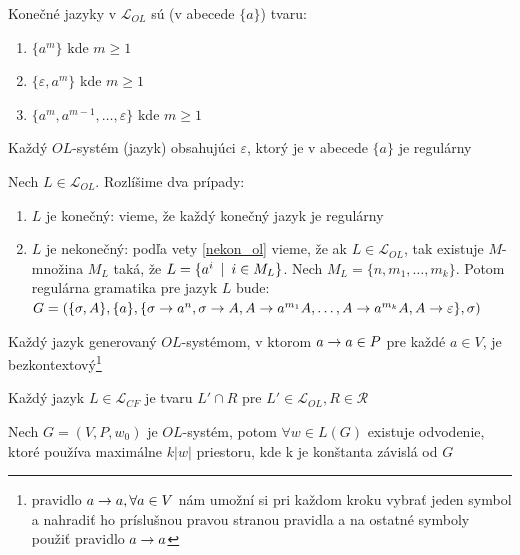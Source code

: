 \begin{poznamka}
    Konečné jazyky v $\mathcal{L}_{OL}$ sú (v abecede $\{a\}$) tvaru:
    \begin{enumerate}
    \item $\{a^{m}\}$ kde $m\geq1$
    \item $\{\varepsilon,a^{m}\}$ kde $m\geq1$
    \item $\{a^{m},a^{m-1},\dots,\varepsilon\}$ kde $m\geq1$
    \end{enumerate}
\end{poznamka}

\begin{veta}
    Každý $OL$-systém (jazyk) obsahujúci $\varepsilon$, ktorý je v
    abecede $\{a\}$ je regulárny
\end{veta}

\begin{dokaz}
    Nech $L\in\mathcal{L}_{OL}$. Rozlíšime dva prípady:
    \begin{enumerate}
    \item $L$ je konečný: vieme, že každý konečný jazyk je regulárny
    \item $L$ je nekonečný: podľa vety \ref{nekon_ol} vieme, že ak
        $L\in\mathcal{L}_{OL}$, tak existuje $M$-množina $M_L$ taká, že
        $L=\{a^i\enspace |\enspace i\in M_L\}$. Nech $M_L=\{n,m_1,\dots,m_k\}$. Potom
        regulárna gramatika pre jazyk $L$ bude:
        $G=(\{\sigma,A\},\{a\},\{\sigma\rightarrow a^n,\sigma\rightarrow A,A\rightarrow
        a^{m_1}A,\dots,A\rightarrow a^{m_k}A,A\rightarrow \varepsilon\},\sigma)$
    \end{enumerate}
\end{dokaz}

\begin{poznamka}
    Každý jazyk generovaný $OL$-systémom, v ktorom $a\rightarrow a\in P$ pre
    každé $a\in V$, je bezkontextový\footnote{pravidlo $a\rightarrow a,\forall
    a\in V$ nám umožní si pri každom kroku vybrať jeden symbol a
    nahradiť ho príslušnou pravou stranou pravidla a na ostatné
    symboly použiť pravidlo $a\rightarrow a$}
\end{poznamka}

\begin{poznamka}
    Každý jazyk $L\in\mathcal{L}_{CF}$ je tvaru $L'\cap R$ pre
    $L'\in\mathcal{L}_{OL},R\in\mathcal{R}$
\end{poznamka}

\begin{lema}
    \label{linear} Nech $G=(V,P,w_0)$ je $OL$-systém, potom $\forall
    w\in L(G)$ existuje odvodenie, ktoré používa ma\-xi\-mál\-ne
    $k|w|$ priestoru, kde k je konštanta závislá od $G$
\end{lema}

